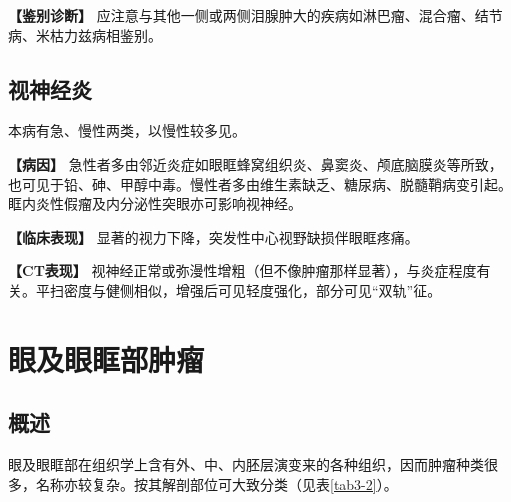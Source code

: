\textbf{【鉴别诊断】}
应注意与其他一侧或两侧泪腺肿大的疾病如淋巴瘤、混合瘤、结节病、米枯力兹病相鉴别。

\subsection{视神经炎}

本病有急、慢性两类，以慢性较多见。

\textbf{【病因】}
急性者多由邻近炎症如眼眶蜂窝组织炎、鼻窦炎、颅底脑膜炎等所致，也可见于铅、砷、甲醇中毒。慢性者多由维生素缺乏、糖尿病、脱髓鞘病变引起。眶内炎性假瘤及内分泌性突眼亦可影响视神经。

\textbf{【临床表现】} 显著的视力下降，突发性中心视野缺损伴眼眶疼痛。

\textbf{【CT表现】}
视神经正常或弥漫性增粗（但不像肿瘤那样显著），与炎症程度有关。平扫密度与健侧相似，增强后可见轻度强化，部分可见“双轨”征。

\section{眼及眼眶部肿瘤}

\subsection{概述}

眼及眼眶部在组织学上含有外、中、内胚层演变来的各种组织，因而肿瘤种类很多，名称亦较复杂。按其解剖部位可大致分类（见表\ref{tab3-2}）。

